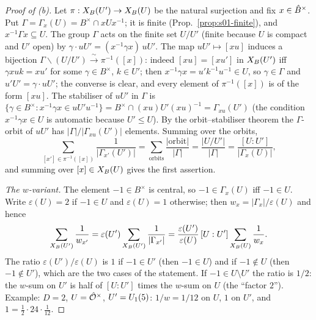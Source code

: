 \begin{proof}[Proof of (b)]
Let $\pi:X_B(U')\to X_B(U)$ be the natural surjection and fix $x\in\hat{B}^\times$. Put $\Gamma=\Gamma_x(U)=B^\times\cap xUx^{-1}$;
it is finite (Prop.~\ref{prop:s01-finite}), and $x^{-1}\Gamma x\subseteq U$. The group $\Gamma$ acts on the finite set $U/U'$
(finite because $U$ is compact and $U'$ open) by $\gamma\cdot uU'=(x^{-1}\gamma x)\,uU'$.
The map $uU'\mapsto[xu]$ induces a bijection $\Gamma\backslash(U/U')\xrightarrow{\ \sim\ }\pi^{-1}([x])$: indeed
$[xu]=[xu']$ in $X_B(U')$ iff $\gamma xu k=xu'$ for some $\gamma\in B^\times$, $k\in U'$; then $x^{-1}\gamma x=u'k^{-1}u^{-1}\in U$,
so $\gamma\in\Gamma$ and $u'U'=\gamma\cdot uU'$; the converse is clear, and every element of $\pi^{-1}([x])$ is of the form $[xu]$.
The stabiliser of $uU'$ in $\Gamma$ is $\{\gamma\in B^\times:x^{-1}\gamma x\in uU'u^{-1}\}=B^\times\cap(xu)U'(xu)^{-1}=\Gamma_{xu}(U')$
(the condition $x^{-1}\gamma x\in U$ is automatic because $U'\le U$). By the orbit--stabiliser theorem the $\Gamma$-orbit of
$uU'$ has $|\Gamma|/|\Gamma_{xu}(U')|$ elements. Summing over the orbits,
\[\sum_{[x']\in\pi^{-1}([x])}\frac1{|\Gamma_{x'}(U')|}=\sum_{\text{orbits}}\frac{|\text{orbit}|}{|\Gamma|}=\frac{|U/U'|}{|\Gamma|}
=\frac{[U:U']}{|\Gamma_x(U)|},\]
and summing over $[x]\in X_B(U)$ gives the first assertion.

\emph{The $w$-variant.} The element $-1\in B^\times$ is central, so $-1\in\Gamma_x(U)$ iff $-1\in U$. Write $\varepsilon(U)=2$ if
$-1\in U$ and $\varepsilon(U)=1$ otherwise; then $w_x=|\Gamma_x|/\varepsilon(U)$ and hence
\[\sum_{X_B(U')}\frac1{w_{x'}}=\varepsilon(U')\sum_{X_B(U')}\frac1{|\Gamma_{x'}|}=\frac{\varepsilon(U')}{\varepsilon(U)}\,[U:U']\sum_{X_B(U)}\frac1{w_x}.\]
The ratio $\varepsilon(U')/\varepsilon(U)$ is $1$ if $-1\in U'$ (then $-1\in U$) and if $-1\notin U$ (then $-1\notin U'$),
which are the two cases of the statement. If $-1\in U\setminus U'$ the ratio is $1/2$: the $w$-sum on $U'$ is half of
$[U:U']$ times the $w$-sum on $U$ (the ``factor $2$''). Example: $D=2$, $U=\hat{\mathcal{O}}^\times$, $U'=U_1(5)$:
$1/w=1/12$ on $U$, $1$ on $U'$, and $1=\tfrac12\cdot24\cdot\tfrac1{12}$.
\end{proof}

